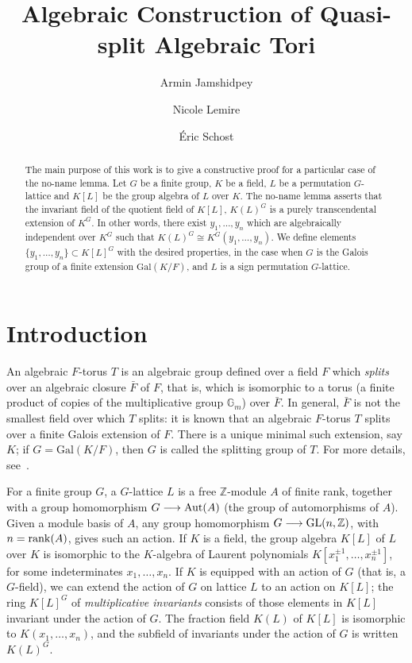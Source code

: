 \documentclass[12pt]{article}
\title{Algebraic Construction of Quasi-split Algebraic Tori}
\author[1]{Armin Jamshidpey}
\author[2]{Nicole Lemire}
\author[1]{\'Eric Schost}
\affil[1]{David Cheriton School of Computer Science, University of Waterloo}
\affil[2]{Department of Mathematics, University of Western Ontario}
\theoremstyle{plain}
\newcommand{\Z}{\ensuremath{\mathbb{Z}}}
\begin{document}
\maketitle


\begin{abstract}

The main purpose of this work is to give a constructive proof for a 
particular case of the no-name lemma. Let $G$ be a
finite group, $K$ be a field, $L$ be a permutation $G$-lattice 
and $K[L]$ be the group algebra of $L$ over
$K$. The no-name lemma asserts that the invariant field of the
quotient field of $K[L]$, $K(L)^G$ is a purely transcendental
extension of $K^G$. In other words, there exist $y_1, \ldots , y_n$
which are algebraically independent over $K^G$ such that $K(L)^G \cong
K^G(y_1, \ldots , y_n)$.  We define elements $\lbrace y_1, \ldots, y_n
\rbrace \subset K[L]^G$ with the desired properties, in the case when
$G$ is the Galois group of a finite extension $\mathrm{Gal}(K/F)$, and
$L$ is a sign permutation $G$-lattice.
\end{abstract}

\section{Introduction}


An algebraic $F$-torus $T$ is an algebraic group defined over a field
$F$ which {\em splits} over an algebraic closure $\bar F$ of $F$, that
is, which is isomorphic to a torus (a finite product of copies of the
multiplicative group $\mathbb{G}_m$) over $\bar{F}$. In general,
$\bar{F}$ is not the smallest field over which $T$ splits: it is known
that an algebraic $F$-torus $T$ splits over a finite Galois extension
of $F$. There is a unique minimal such extension, say $K$; if $G =
\mathrm{Gal}(K/F)$, then $G$ is called the splitting group of $T$. For
more details, 
see~\cite[p. 27]{Voskresenskii}.

For a finite group $G$, a $G$-lattice $L$ is a free $\Z$-module $A$ of
finite rank, together with a group homomorphism $G \longrightarrow
{\rm Aut}(A)$ (the group of automorphisms of $A$). Given a module
basis of $A$, any group homomorphism $G \longrightarrow {\rm
  GL}(n,\Z)$, with $n={\rm rank}(A)$, gives such an action.  If $K$ is
a field, the group algebra $K[L]$ of $L$ over $K$ is isomorphic to the
$K$-algebra of Laurent polynomials $K[x_1^{\pm 1},\dots,x_n^{\pm 1}]$,
for some indeterminates $x_1,\dots,x_n$.  If $K$ is equipped with an
action of $G$ (that is, a $G$-field), we can extend the action of $G$
on lattice $L$ to an action on $K[L]$; the ring $K[L]^G$ of {\em
  multiplicative invariants} consists of those elements in $K[L]$
invariant under the action of $G$. The fraction field $K(L)$ of $K[L]$
is isomorphic to $K(x_1,\dots,x_n)$, and the subfield of invariants
under the action of $G$ is written $K(L)^G$.
\end{document}
